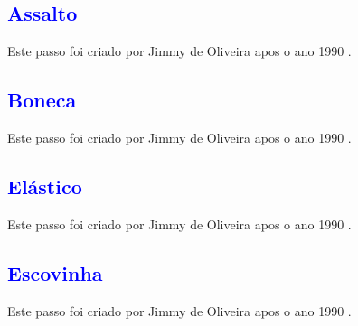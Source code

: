 
\subsection{\textcolor{blue}{Assalto}} 
Este passo foi criado por Jimmy de Oliveira apos o ano 1990 \cite{sambafunkeadoJimmyDeOliveiraPart1}.

\subsection{\textcolor{blue}{Boneca}} 
Este passo foi criado por Jimmy de Oliveira apos o ano 1990 \cite{sambafunkeadoJimmyDeOliveiraPart1}.

\subsection{\textcolor{blue}{Elástico}} 
Este passo foi criado por Jimmy de Oliveira apos o ano 1990 \cite{sambafunkeadoJimmyDeOliveiraPart1}.

\subsection{\textcolor{blue}{Escovinha}}
Este passo foi criado por Jimmy de Oliveira apos o ano 1990 \cite{sambafunkeadoJimmyDeOliveiraPart1}.

